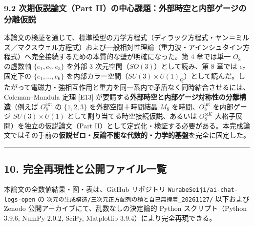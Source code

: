 \documentclass[
  a4paper,
]{ltjsarticle}
\begin{document}
\subsubsection{9.2 次期仮説論文（Part
II）の中心課題：外部時空と内部ゲージの分離仮説}\label{ux6b21ux671fux4eeeux8aacux8ad6ux6587part-iiux306eux4e2dux5fc3ux8ab2ux984cux5916ux90e8ux6642ux7a7aux3068ux5185ux90e8ux30b2ux30fcux30b8ux306eux5206ux96e2ux4eeeux8aac}

本論文の検証を通じて、標準模型の力学方程式（ディラック方程式・ヤン＝ミルズ／マクスウェル方程式）および一般相対性理論（重力波・アインシュタイン方程式）へ完全接続するための本質的な壁が明確になった。第
4 章では単一 \(O_8\) の虚数軸 \(\{e_1, e_2, e_3\}\) を外部 3
次元空間（\(SO(3)\)）として読み、第 8 章では \(e_7\) 固定下の
\(\{e_1, \dots, e_6\}\)
を内部カラー空間（\(SU(3)\times U(1)_Q\)）として読んだ。したがって電磁力・強相互作用と重力を同一系内で矛盾なく同時結合させるには、Coleman--Mandula
定理 {[}E13{]}
が要請する\textbf{外部時空と内部ゲージ対称性の分離構造}（例えば
\(O_8^{\mathrm{ext}}\) の \(\{1,2,3\}\) を外部空間＋時間結晶 \(M_8\)
を時間、\(O_8^{\mathrm{int}}\) を内部ゲージ \(SU(3)\times U(1)\)
として割り当てる時空接続仮説、あるいは \(O_8^{\otimes K}\)
大格子展開）を独立の仮説論文（Part
II）として定式化・検証する必要がある。本完成論文ではその手前の\textbf{仮説ゼロ・反論不能な代数的・力学的基盤}を完全に固定した。

\begin{center}\rule{0.5\linewidth}{0.5pt}\end{center}

\subsection{10.
完全再現性と公開ファイル一覧}\label{ux5b8cux5168ux518dux73feux6027ux3068ux516cux958bux30d5ux30a1ux30a4ux30ebux4e00ux89a7}

本論文の全数値結果・図・表は、GitHub リポジトリ
\texttt{WurabeSeiji/ai-chat-logs-open} の
\texttt{次元の生成構造/三次元正方配列の積と自己無撞着\_20261127/}
以下および Zenodo 公開アーカイブにて、乱数なしの決定論的 Python
スクリプト（Python 3.9.6, NumPy 2.0.2, SciPy, Matplotlib
3.9.4）により完全再現できる。
\end{document}
